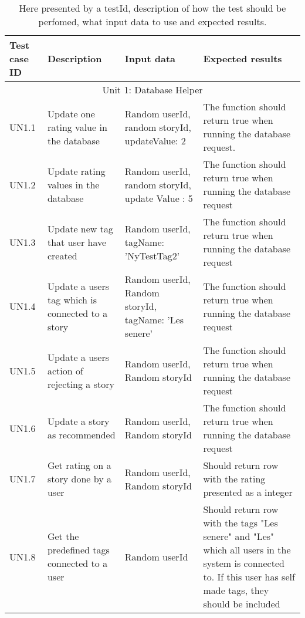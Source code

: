 {\renewcommand{\arraystretch}{2}%
\begin{center}
\begin{longtable}{ | p{1.5cm} | p{6.5cm} | p{3cm} | p{6.5cm} |}
\caption[Unit Test cases]{ Here presented by a testId, description of how the test should be perfomed, what input data to use and expected results.} \label{Tab_unittestcases}\\

\hline {\bf Test case ID} & {\bf Description} & {\bf Input data} & {\bf Expected results} \\ \hline

\multicolumn{4}{c}{Unit 1: Database Helper}	\\\hline
			
			UN1.1 & Update one rating value in the database & Random userId, random storyId, updateValue: 2 & The function should return true when running the database request. \\\hline
			
			UN1.2 & Update rating values in the database & Random userId, random storyId, update Value : 5 & The function should return true when running the database request\\\hline
			
			UN1.3 & Update new tag that user have created & Random userId, tagName: 'NyTestTag2' & The function should return true when running the database request\\\hline
			
			UN1.4 & Update a users tag which is connected to a story & Random userId, Random storyId, tagName: 'Les senere' & The function should return true when running the database request \\\hline
			
			UN1.5 & Update a users action of rejecting a story & Random userId, Random storyId & The function should return true when running the database request  \\\hline
			
			UN1.6 & Update a story as recommended & Random userId, Random storyId & The function should return true when running the database request \\\hline
			
			UN1.7 & Get rating on a story done by a user  & Random userId, Random storyId & Should return row with the rating presented as a integer  \\ \hline			
		
			UN1.8 & Get the predefined tags connected to a user & Random userId & Should return row with the tags "Les senere" and "Les" which all users in the system is connected to. If this user has self made tags, they should be included \\ \hline
			

\end{longtable}
\end{center}}
